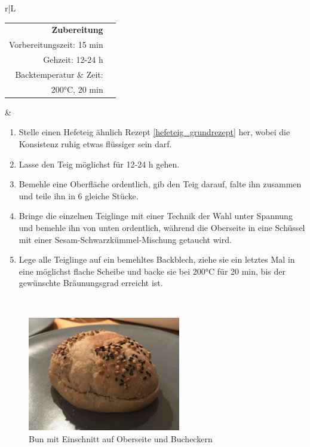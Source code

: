 \documentclass[a4paper, 12pt]{scrbook} 								%
\numberwithin{equation}{section} 									%
\begin{document}
				\newpage
				\begin{tabularx}{\textwidth}{r|L}
			
			
				\begin{tabular}[t]{rr}
					\textbf{Zubereitung}	\\
					Vorbereitungszeit: 15 min	\\
					Gehzeit:	12-24 h		\\
					Backtemperatur \& Zeit: \\
					200°C, 20 min
				\end{tabular}			&	\begin{enumerate}[]
												\item Stelle einen Hefeteig ähnlich Rezept \ref{hefeteig_grundrezept} her, wobei die Konsistenz ruhig etwas flüssiger sein darf.
												\item Lasse den Teig möglichst für 12-24 h gehen.
												\item Bemehle eine Oberfläche ordentlich, gib den Teig darauf, falte ihn zusammen und teile ihn in 6 gleiche Stücke.
												\item Bringe die einzelnen Teiglinge mit einer Technik der Wahl unter Spannung und bemehle ihn von unten ordentlich, während die Oberseite in eine Schüssel mit einer Sesam-Schwarzkümmel-Mischung getaucht wird.
												\item Lege alle Teiglinge auf ein bemehltes Backblech, ziehe sie ein letztes Mal in eine möglichst flache Scheibe und backe sie bei 200°C für 20 min, bis der gewünschte Bräunungsgrad erreicht ist.  
											\end{enumerate}	\\
			\end{tabularx}

			\begin{figure}[h]
				\centering
				\includegraphics[height = 5cm]{media/burger_broetchen.JPG}
				\caption{Bun mit Einschnitt auf Oberseite und Bucheckern}
			\end{figure}
\end{document}
